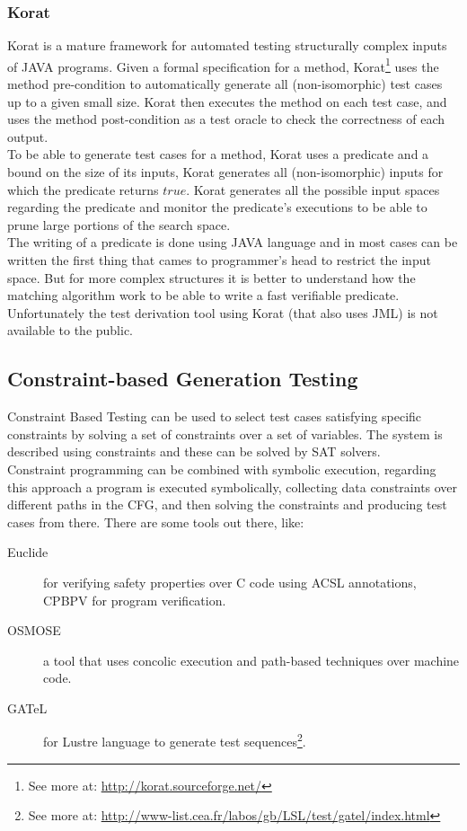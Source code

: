\documentclass[a4paper,UKenglish]{oasics}
\begin{document}
\subsubsection{Korat}
Korat\cite{Boyapati02korat:automated} is a mature framework for automated testing structurally complex inputs of JAVA programs.
Given a formal specification for a method, Korat\footnote{See more at: \url{http://korat.sourceforge.net/}} uses the method pre-condition
to automatically generate all (non-isomorphic) test cases up to a given small size.
Korat then executes the method on each test case, and uses the method post-condition as a test oracle to check the correctness of each output.\\
To be able to generate test cases for a method, Korat uses a predicate and a bound on the size of its inputs,
Korat generates all (non-isomorphic) inputs for which the predicate returns $true$.
Korat generates all the possible input spaces regarding the predicate and monitor the predicate's executions to be able to prune large portions of the search space.\\
\indent The writing of a predicate is done using JAVA language and in most cases can be written the first thing that cames to programmer's head to restrict the input space.
But for more complex structures it is better to understand how the matching algorithm work to be able to write a fast verifiable predicate.\\
Unfortunately the test derivation tool using Korat (that also uses JML) is not available to the public.

\subsection{Constraint-based Generation Testing}
Constraint Based Testing\cite{DeMillo91constraint-basedautomatic} can be used to select test cases satisfying specific constraints by
solving a set of constraints over a set of variables. The system is described using constraints and these can be solved by SAT solvers.\\
Constraint programming can be combined with symbolic execution, regarding this approach a program is executed symbolically,
collecting data constraints over different paths in the CFG, and then solving the constraints and producing test cases from there.
There are some tools out there, like:

\begin{description}
\item[Euclide] for verifying safety properties over C code using ACSL annotations, CPBPV for program verification.
\item[OSMOSE] a tool that uses concolic execution and path-based techniques over machine code.
\item[GATeL] for Lustre language to generate test sequences\footnote{See more at: \url{http://www-list.cea.fr/labos/gb/LSL/test/gatel/index.html}}.
\end{description}
\end{document}
